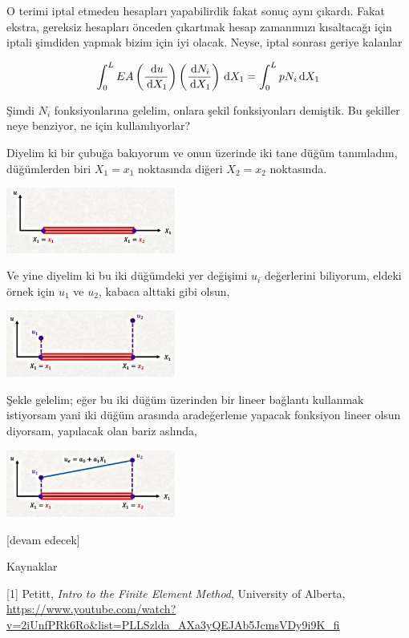 \documentclass[12pt,fleqn]{article}\usepackage{../../common}
\begin{document}
O terimi iptal etmeden hesapları yapabilirdik fakat sonuç aynı çıkardı. Fakat
ekstra, gereksiz hesapları önceden çıkartmak hesap zamanımızı kısaltacağı için
iptali şimdiden yapmak bizim için iyi olacak. Neyse, iptal sonrası geriye
kalanlar

$$
\int_{0}^{L} EA
\left( \frac{\,\mathrm{d} u}{\,\mathrm{d} X_1} \right)
\left( \frac{\,\mathrm{d} N_i}{\,\mathrm{d} X_1} \right) \,\mathrm{d} X_1
= \int _{0}^{L} p N_i \,\mathrm{d} X_1 
$$

Şimdi $N_i$ fonksiyonlarına gelelim, onlara şekil fonksiyonları demiştik.
Bu şekiller neye benziyor, ne için kullanılıyorlar?

Diyelim ki bir çubuğa bakıyorum ve onun üzerinde iki tane düğüm tanımladım,
düğümlerden biri $X_1 = x_1$ noktasında diğeri $X_2 = x_2$ noktasında.

\includegraphics[width=15em]{compscieng_bpp45fem2_05.jpg}

Ve yine diyelim ki bu iki düğümdeki yer değişimi $u_i$ değerlerini biliyorum,
eldeki örnek için $u_1$ ve $u_2$, kabaca alttaki gibi olsun,

\includegraphics[width=15em]{compscieng_bpp45fem2_06.jpg}

Şekle gelelim; eğer bu iki düğüm üzerinden bir lineer bağlantı kullanmak
istiyorsam yani iki düğüm arasında aradeğerleme yapacak fonksiyon lineer olsun
diyorsam, yapılacak olan bariz aslında,

\includegraphics[width=15em]{compscieng_bpp45fem2_07.jpg}














[devam edecek]

Kaynaklar

[1] Petitt, {\em Intro to the Finite Element Method}, University of Alberta,
    \url{https://www.youtube.com/watch?v=2iUnfPRk6Ro&list=PLLSzlda_AXa3yQEJAb5JcmsVDy9i9K_fi}
\end{document}
